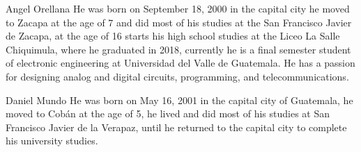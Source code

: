 \begin{IEEEbiography}{Angel Orellana}
He was born on September 18, 2000 in the capital city
he moved to Zacapa at the age of 7 and did most of his studies at the
San Francisco Javier de Zacapa, at the age of 16 starts his high school studies at the
Liceo La Salle Chiquimula, where he graduated in 2018, currently
he is a final semester student of 
electronic engineering at Universidad del Valle 
de Guatemala. He has a passion for designing analog and digital circuits, 
programming, and telecommunications.
\end{IEEEbiography}

\begin{IEEEbiography}{Daniel Mundo}
    He was born on May 16, 2001 in the capital city of Guatemala, he moved to Cobán at the age of 5, he lived and did most of his studies at San Francisco Javier de la Verapaz, until he returned to the capital city to complete his university studies.
    \end{IEEEbiography}
        
